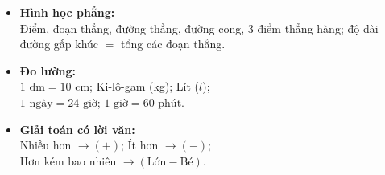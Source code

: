 \documentclass[11pt,a4paper]{article}
\begin{document}
\begin{minipage}[t]{0.49\textwidth}\vspace{0pt}
\begin{tcolorbox}[
  enhanced,
  colback=teal!4!white,
  colframe=teal!75!black,
  arc=2mm, boxrule=0.8pt,
  left=2mm, right=2mm, top=1.8mm, bottom=1.8mm,
  title={\footnotesize\bfseries\color{white}\faSliders\ 2. Trụ cột Hình học, Đo lường \& Giải toán}
]
{\footnotesize
\begin{itemize}\setlength{\itemsep}{1pt}\setlength{\leftskip}{-2.5mm}
  \item \textbf{Hình học phẳng:}\\
  Điểm, đoạn thẳng, đường thẳng, đường cong, 3 điểm thẳng hàng; độ dài đường gấp khúc $=$ tổng các đoạn thẳng.
  \item \textbf{Đo lường:}\\
  $1\text{ dm} = 10\text{ cm}$; Ki-lô-gam (kg); Lít ($l$);\\
  $1\text{ ngày} = 24\text{ giờ}$; $1\text{ giờ} = 60\text{ phút}$.
  \item \textbf{Giải toán có lời văn:}\\
  Nhiều hơn $\to (+)$; Ít hơn $\to (-)$;\\
  Hơn kém bao nhiêu $\to (\text{Lớn} - \text{Bé})$.
\end{itemize}
}
\end{tcolorbox}
\end{minipage}
\end{document}
